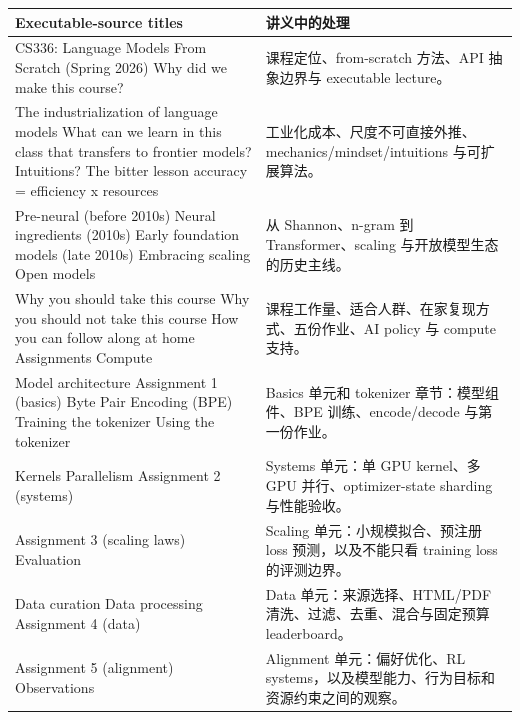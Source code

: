 \begin{longtable}{p{}p{}}
\toprule
\textbf{Executable-source titles} & \textbf{讲义中的处理} \\
\midrule
CS336: Language Models From Scratch (Spring 2026)\newline
Why did we make this course? & 课程定位、from-scratch 方法、API 抽象边界与 executable lecture。 \\
The industrialization of language models\newline
What can we learn in this class that transfers to frontier models?\newline
Intuitions?\newline
The bitter lesson\newline
accuracy = efficiency x resources & 工业化成本、尺度不可直接外推、mechanics/mindset/intuitions 与可扩展算法。 \\
Pre-neural (before 2010s)\newline
Neural ingredients (2010s)\newline
Early foundation models (late 2010s)\newline
Embracing scaling\newline
Open models & 从 Shannon、n-gram 到 Transformer、scaling 与开放模型生态的历史主线。 \\
Why you should take this course\newline
Why you should not take this course\newline
How you can follow along at home\newline
Assignments\newline
Compute & 课程工作量、适合人群、在家复现方式、五份作业、AI policy 与 compute 支持。 \\
Model architecture\newline
Assignment 1 (basics)\newline
Byte Pair Encoding (BPE)\newline
Training the tokenizer\newline
Using the tokenizer & Basics 单元和 tokenizer 章节：模型组件、BPE 训练、encode/decode 与第一份作业。 \\
Kernels\newline
Parallelism\newline
Assignment 2 (systems) & Systems 单元：单 GPU kernel、多 GPU 并行、optimizer-state sharding 与性能验收。 \\
Assignment 3 (scaling laws)\newline
Evaluation & Scaling 单元：小规模拟合、预注册 loss 预测，以及不能只看 training loss 的评测边界。 \\
Data curation\newline
Data processing\newline
Assignment 4 (data) & Data 单元：来源选择、HTML/PDF 清洗、过滤、去重、混合与固定预算 leaderboard。 \\
Assignment 5 (alignment)\newline
Observations & Alignment 单元：偏好优化、RL systems，以及模型能力、行为目标和资源约束之间的观察。 \\
\bottomrule
\end{longtable}

